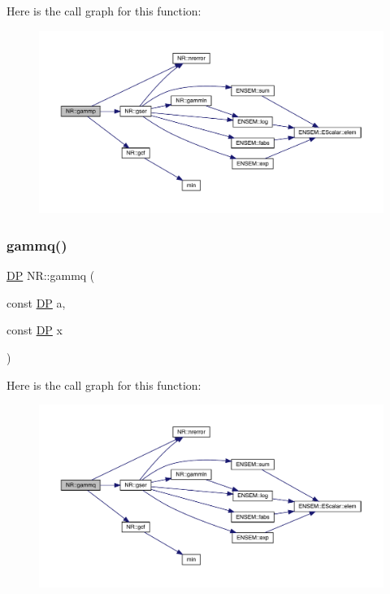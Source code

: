 Here is the call graph for this function\+:
\nopagebreak
\begin{figure}[H]
\begin{center}
\leavevmode
\includegraphics[width=350pt]{da/d46/namespaceNR_ad617f7290581d8abbf35fb5e8206ffc8_cgraph}
\end{center}
\end{figure}
\mbox{\label{namespaceNR_aae834b3eabbd4eb103d876551fe4a8bf}} 
\subsubsection{\texorpdfstring{gammq()}{gammq()}}
{\footnotesize\ttfamily \mbox{\hyperlink{namespaceNR_af6ff762dd605ff477b8e52387253a02a}{DP}} N\+R\+::gammq (\begin{DoxyParamCaption}\item[{const \mbox{\hyperlink{namespaceNR_af6ff762dd605ff477b8e52387253a02a}{DP}}}]{a,  }\item[{const \mbox{\hyperlink{namespaceNR_af6ff762dd605ff477b8e52387253a02a}{DP}}}]{x }\end{DoxyParamCaption})}

Here is the call graph for this function\+:
\nopagebreak
\begin{figure}[H]
\begin{center}
\leavevmode
\includegraphics[width=350pt]{da/d46/namespaceNR_aae834b3eabbd4eb103d876551fe4a8bf_cgraph}
\end{center}
\end{figure}
\mbox{\label{namespaceNR_a035bd09228723898ec5481668f55c979}} 

